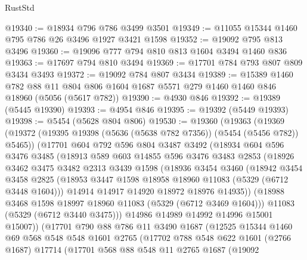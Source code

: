 \begin{lexlean}{RustStd}
\begin{coremodule}
@19340 := @18934 @796 @786 @3499 @3501
@19349 := @11055 @15344 @1460 @795 @786 @26 @3496 @1927 @3421 @1598
@19352 := @19092 @795 @813 @3496
@19360 := @19096 @777 @794 @810 @813 @1604 @3494 @1460 @836
@19363 := @17697 @794 @810 @3494
@19369 := @17701 @784 @793 @807 @809 @3434 @3493
@19372 := @19092 @784 @807 @3434
@19389 := @15389
    @1460
    @782
    @88
    @11
    @804
    @806
    @1604
    @1687
    @5571
    @279
    @1460
    @1460
    @846
    @18960
    (@5056 (@5617 @782))
@19390 := @4930 @846
@19392 := @19389 (@5445 @19390)
@19393 := @4954 @846
@19395 := @19392 (@5449 @19393)
@19398 := @5454 (@5628 @804 @806)
@19530 := @19360
    (@19363
      (@19369
        (@19372 (@19395 @19398 (@5636 (@5638 @782 @7356)) (@5454 (@5456 @782)) @5465))
        (@17701
          @604
          @792
          @596
          @804
          @3487
          @3492
          (@18934
            @604
            @596
            @3476
            @3485
            (@18913
              @589
              @603
              @14855
              @596
              @3476
              @3483
              @2853
              (@18926
                @3462
                @3475
                @3482
                @2313
                @3439
                @1598
                (@18936
                  @3454
                  @3460
                  (@18942
                    @3454
                    @3458
                    @2825
                    (@18953 @3447 @1598 @18958 @18960 @11083 (@5329 (@6712 @3448 @1604)))
                    @14914
                    @14917
                    @14920
                    @18972
                    @18976
                    @14935))
                (@18988 @3468 @1598 @18997 @18960 @11083 (@5329 (@6712 @3469 @1604)))
                @11083
                (@5329 (@6712 @3440 @3475)))
              @14986
              @14989
              @14992
              @14996
              @15001
              @15007))
          (@17701
            @790
            @88
            @786
            @11
            @3490
            @1687
            (@12525
              @15344
              @1460
              @69
              @568
              @548
              @548
              @1601
              @2765
              (@17702
                @788
                @548
                @622
                @1601
                (@2766 @1687)
                @17714
                (@17701
                  @568
                  @88
                  @548
                  @11
                  @2765
                  @1687
                  (@19092

\end{coremodule}
\end{lexlean}

